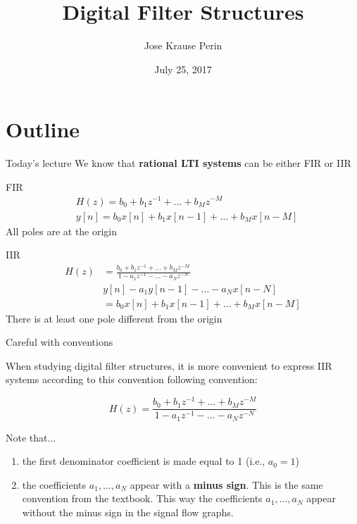 \documentclass[10pt, aspectratio=169, handout]{beamer}
\title[EE 264]{Digital Filter Structures}
\author{Jose Krause Perin}
\institute{Stanford University}
\date{July 25, 2017}
\begin{document}
\begin{frame}
  \titlepage
\end{frame}

\section{Outline}
%
\begin{frame}{Today's lecture}
We know that \textbf{rational LTI systems} can be either FIR or IIR
\begin{block}{FIR}
	\vspace{-0.5cm}
	\begin{align}
		&H(z) =  b_0 + b_1z^{-1} + \ldots + b_Mz^{-M} \tag{$z$-transform} \\
		&y[n] = b_0x[n] + b_1x[n-1] + \ldots + b_Mx[n-M] \tag{difference equation}
	\end{align}
	All poles are at the origin
\end{block}

\begin{block}{IIR}
	\vspace{-0.5cm}
	\begin{align*}
	H(z) &=  \frac{b_0 + b_1z^{-1} + \ldots + b_Mz^{-M}}{1 - a_1z^{-1} - \ldots - a_Nz^{-N}} \tag{$z$-transform} \\
	&y[n] - a_1y[n-1] - \ldots - a_Nx[n-N]  \\
	&= b_0x[n] + b_1x[n-1] + \ldots + b_Mx[n-M] \tag{difference equation}
	\end{align*}
	There is at least one pole different from the origin
\end{block}

\end{frame}

\begin{frame}{Careful with conventions}
	
	When studying digital filter structures, it is more convenient to express IIR systems according to this convention following convention: 

	\begin{equation}
		H(z) =  \frac{b_0 + b_1z^{-1} + \ldots + b_Mz^{-M}}{1 - a_1z^{-1} - \ldots - a_Nz^{-N}}
	\end{equation}
	
	Note that...
	\begin{enumerate}
		\item the first denominator coefficient is made equal to 1 (i.e., $a_0 = 1$)
		\item the coefficients $a_1, \ldots, a_N$ appear with a \textbf{minus sign}. This is the same convention from the textbook. This way the coefficients $a_1, \ldots, a_N$ appear without the minus sign in the signal flow graphs.
	\end{enumerate}

\end{frame}
\end{document}
